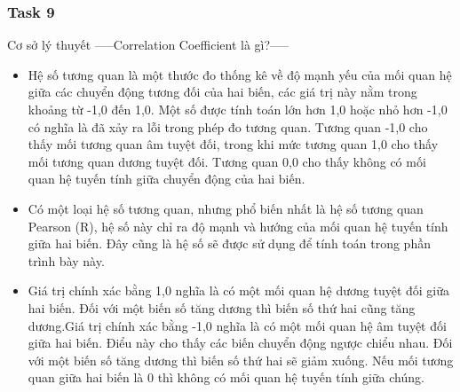 \documentclass[english,10pt,table]{beamer}
\begin{document}
{
    \frametitle{Task 9}
    \begin{block}{Cơ sở lý thuyết}
    -----Correlation Coefficient là gì?-----\\
		\begin{itemize}
		    \small\item Hệ số tương quan là một thước đo thống kê về độ mạnh yếu của mối quan hệ giữa các chuyển động tương đối của hai biến, các giá trị này nằm trong khoảng từ -1,0 đến 1,0. Một số được tính toán lớn hơn 1,0 hoặc nhỏ hơn -1,0 có nghĩa là đã xảy ra lỗi trong phép đo tương quan. Tương quan -1,0 cho thấy mối tương quan âm tuyệt đối, trong khi mức tương quan 1,0 cho thấy mối tương quan dương tuyệt đối. Tương quan 0,0 cho thấy không có mối quan hệ tuyến tính giữa chuyển động của hai biến.\\
		
		    \small\item Có một loại hệ số tương quan, nhưng phổ biến nhất là hệ số tương quan Pearson (R), hệ số này chỉ ra độ mạnh và hướng của mối quan hệ tuyến tính giữa hai biến. Đây cũng là hệ số sẽ được sử dụng để tính toán trong phần trình bày này.\\
		
		    \small\item Giá trị chính xác bằng 1,0 nghĩa là có một mối quan hệ dương tuyệt đối giữa hai biến. Đối với một biến số tăng dương thì biến số thứ hai cũng tăng dương.Giá trị chính xác bằng -1,0 nghĩa là có một mối quan hệ âm tuyệt đối giữa hai biến. Điểu này cho thấy các biến chuyển động ngược chiểu nhau. Đối với một biến số tăng dương thì biến số thứ hai sẽ giảm xuống. Nếu mối tương quan giữa hai biến là 0 thì không có mối quan hệ tuyến tính giữa chúng.\\
		\end{itemize}
    \end{block}
}
\frame
\end{document}
